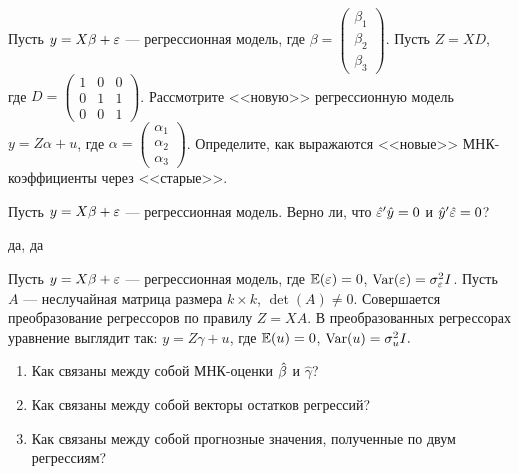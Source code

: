 \documentclass[pdftex,11pt,openany]{book}\usepackage[]{graphicx}\usepackage[]{color}
\begin{document}
\begin{problem}
Пусть $y = X\beta + \varepsilon$ --- регрессионная модель, где $\beta = \begin{pmatrix} \beta_1 \\ \beta_2 \\ \beta_3 \end{pmatrix}$. Пусть $Z = XD$, где $D = \begin{pmatrix} 1 & 0 & 0 \\ 0 & 1 & 1 \\ 0 & 0 & 1 \end{pmatrix}$. Рассмотрите <<новую>> регрессионную модель $y = Z\alpha + u$, где $\alpha = \begin{pmatrix} \alpha_1 \\ \alpha_2 \\ \alpha_3 \end{pmatrix}$. Определите, как выражаются <<новые>> МНК-коэффициенты через <<старые>>.

\end{problem}

\begin{solution}
\end{solution}


\begin{problem}
Пусть $y = X\beta + \varepsilon$ --- регрессионная модель. Верно ли, что $\hat{\varepsilon}'\hat{y}=0$ и $\hat{y}'\hat{\varepsilon}=0$?
\end{problem}
\begin{solution}
да, да
\end{solution}

\begin{problem}
Пусть $y = X\beta + \varepsilon$ --- регрессионная модель, где $\mathbb{E}(\varepsilon)=0$, $\operatorname{Var}(\varepsilon)=\sigma_{\varepsilon}^2 I$. Пусть $A$ --- неслучайная матрица размера $k \times k$, $\det(A) \not= 0.$ Совершается преобразование регрессоров по правилу $Z=XA$. В преобразованных регрессорах уравнение выглядит так: $y = Z\gamma + u$, где $\mathbb{E}(u)=0$, $\operatorname{Var}(u)=\sigma_{u}^2 I.$

\begin{enumerate}
\item Как связаны между собой МНК-оценки $\hat{\beta}$ и $\hat{\gamma}$?
\item Как связаны между собой векторы остатков регрессий?
\item Как связаны между собой прогнозные значения, полученные по двум регрессиям?
\end{enumerate}
\end{problem}
\end{document}
